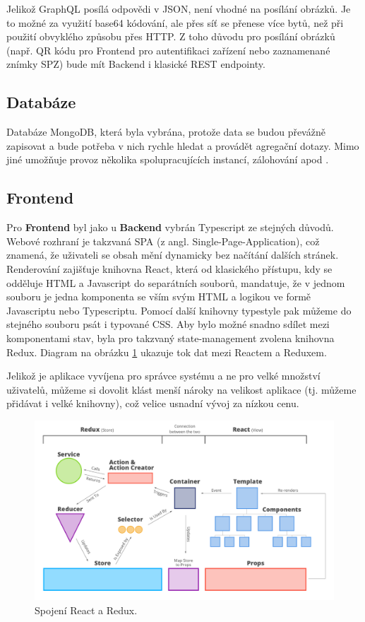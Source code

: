 Jelikož GraphQL posílá odpovědi v JSON, není vhodné na posílání obrázků. Je to možné za využití base64 kódování,
ale přes síť se přenese více bytů, než při použití obvyklého způsobu přes HTTP. Z toho důvodu pro posílání
obrázků (např. QR kódu pro Frontend pro autentifikaci zařízení nebo zaznamenané znímky SPZ) bude mít Backend i
klasické REST endpointy.

\subsection{Databáze}

Databáze MongoDB, která byla vybrána, protože data se budou převážně zapisovat a bude potřeba v nich rychle hledat a provádět agregační dotazy.
Mimo jiné umožňuje provoz několika spolupracujících instancí, zálohování apod \citep[viz][]{MongoDB}.

\subsection{Frontend} \label{frontend}

Pro \textbf{Frontend} byl jako u \textbf{Backend} vybrán Typescript ze stejných důvodů. Webové rozhraní
je takzvaná SPA (z angl. Single-Page-Application), což znamená, že uživateli se obsah mění dynamicky
bez načítání dalších stránek.
Renderování zajišťuje knihovna React, která od klasického přístupu, kdy se odděluje HTML a Javascript do separátních
souborů, mandatuje, že v jednom souboru je jedna komponenta se vším svým HTML a logikou ve formě Javascriptu nebo
Typescriptu. Pomocí další knihovny typestyle pak můžeme do stejného souboru psát i typované CSS.
Aby bylo možné snadno sdílet mezi komponentami stav, byla pro takzvaný state-management zvolena knihovna Redux.
Diagram na obrázku \ref{fig:react_redux_dataflow} ukazuje tok dat mezi Reactem a Reduxem.

Jelikož je aplikace vyvíjena pro správce systému a ne pro velké množství uživatelů, můžeme si dovolit
klást menší nároky na velikost aplikace (tj. můžeme přidávat i velké knihovny), což velice usnadní vývoj za
nízkou cenu.

\begin{figure}[!htb] \centering
\includegraphics[width=145mm]{../img/react-redux-architecture.png}
\caption{Spojení React a Redux. \citep[viz][]{react_redux_dataflow}}
\label{fig:react_redux_dataflow}
\end{figure}

